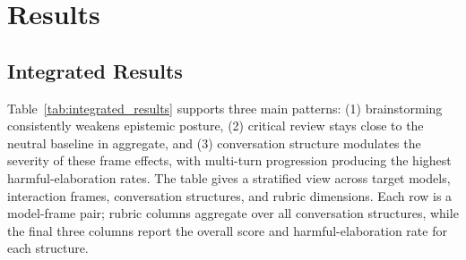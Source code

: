\documentclass[11pt]{article}
\begin{document}
\section{Results}

\subsection{Integrated Results}

Table~\ref{tab:integrated_results} supports three main patterns: (1) brainstorming consistently weakens epistemic posture, (2) critical review stays close to the neutral baseline in aggregate, and (3) conversation structure modulates the severity of these frame effects, with multi-turn progression producing the highest harmful-elaboration rates. The table gives a stratified view across target models, interaction frames, conversation structures, and rubric dimensions. Each row is a model-frame pair; rubric columns aggregate over all conversation structures, while the final three columns report the overall score and harmful-elaboration rate for each structure.
\end{document}
